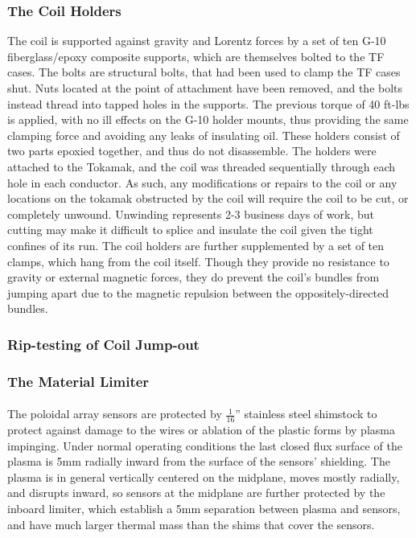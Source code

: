 \subsubsection{The Coil Holders}
The coil is supported against gravity and Lorentz forces by a set of ten  G-10 fiberglass/epoxy composite supports, which are themselves bolted to the TF cases.  The bolts are structural bolts, that had been used to clamp the TF cases shut.  Nuts located at the point of attachment have been removed, and the bolts instead thread into tapped holes in the supports.  The previous torque of 40 ft-lbs is applied, with no ill effects on the G-10 holder mounts, thus providing the same clamping force and avoiding any leaks of insulating oil.
These holders consist of two parts epoxied together, and thus do not disassemble.  The holders were attached to the Tokamak, and the coil was threaded sequentially through each hole in each conductor.  As such, any modifications or repairs to the coil or any locations on the tokamak obstructed by the coil will require the coil to be cut, or completely unwound.  Unwinding represents 2-3 business days of work, but cutting may make it difficult to splice and insulate the coil given the tight confines of its run.
The coil holders are further supplemented by a set of ten clamps, which hang from the coil itself.  Though they provide no resistance to gravity or external magnetic forces, they do prevent the coil's bundles from jumping apart due to the magnetic repulsion between the oppositely-directed bundles.
\subsubsection{Rip-testing of Coil Jump-out}
 
\subsubsection{The Material Limiter}
\paragraph{}The poloidal array sensors are protected by $\frac{1}{16}$'' stainless steel shimstock to protect against damage to the wires or ablation of the plastic forms by plasma impinging.  Under normal operating conditions the last closed flux surface of the plasma is 5mm radially inward from the surface of the sensors' shielding.  The plasma is in general vertically centered on the midplane, moves mostly radially, and disrupts inward, so sensors at the midplane are further protected by the inboard limiter, which establish a 5mm separation between plasma and sensors, and have much larger thermal mass than the shims that cover the sensors.
